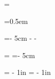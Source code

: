 %
%
%
%
%
%


\newif\ifbindingleft  \bindinglefttrue   %
\newif\ifdoublesided  \doublesidedtrue   %
\newif\ifnotesouter   \notesoutertrue    %


\pdfpagewidth=210mm
\pdfpageheight=297mm   %

\newdimen\marginwidth
\marginwidth=\pdfpagewidth \relax  %

\newdimen\marginparsep
\marginparsep=0.5em

\newdimen\bodywidth
\bodywidth=\dimexpr \pdfpagewidth - 5cm - \marginwidth - \marginparsep \relax

\hsize=\bodywidth
\vsize=\dimexpr \pdfpageheight - 5cm \relax

\hoffset=\dimexpr 2.5cm - 1in \relax
\voffset=\dimexpr 2.5cm - 1in \relax

